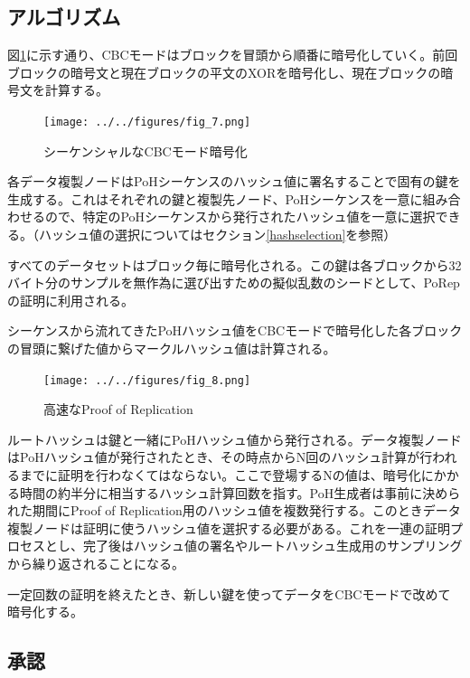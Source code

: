 \documentclass[12pt]{ltjsarticle}
\begin{document}
\subsection{アルゴリズム}
図\ref{fig:encrypt}に示す通り、CBCモードはブロックを冒頭から順番に暗号化していく。前回ブロックの暗号文と現在ブロックの平文のXORを暗号化し、現在ブロックの暗号文を計算する。

\begin{figure}
  \begin{center}
    \centering
    \texttt{[image: ../../figures/fig\_7.png]}
    \caption[図7]{シーケンシャルなCBCモード暗号化\label{fig:encrypt}}
  \end{center}
  \end{figure}

各データ複製ノードはPoHシーケンスのハッシュ値に署名することで固有の鍵を生成する。これはそれぞれの鍵と複製先ノード、PoHシーケンスを一意に組み合わせるので、特定のPoHシーケンスから発行されたハッシュ値を一意に選択できる。（ハッシュ値の選択についてはセクション\ref{hashselection}を参照）

すべてのデータセットはブロック毎に暗号化される。この鍵は各ブロックから32バイト分のサンプルを無作為に選び出すための擬似乱数のシードとして、PoRepの証明に利用される。

シーケンスから流れてきたPoHハッシュ値をCBCモードで暗号化した各ブロックの冒頭に繋げた値からマークルハッシュ値は計算される。

\begin{figure}
  \begin{center}
    \centering
    \texttt{[image: ../../figures/fig\_8.png]}
    \caption[図8]{高速なProof of Replication\label{fig_8}}
  \end{center}
  \end{figure}

ルートハッシュは鍵と一緒にPoHハッシュ値から発行される。データ複製ノードはPoHハッシュ値が発行されたとき、その時点からN回のハッシュ計算が行われるまでに証明を行わなくてはならない。ここで登場するNの値は、暗号化にかかる時間の約半分に相当するハッシュ計算回数を指す。PoH生成者は事前に決められた期間にProof of Replication用のハッシュ値を複数発行する。このときデータ複製ノードは証明に使うハッシュ値を選択する必要がある。これを一連の証明プロセスとし、完了後はハッシュ値の署名やルートハッシュ生成用のサンプリングから繰り返されることになる。

一定回数の証明を終えたとき、新しい鍵を使ってデータをCBCモードで改めて暗号化する。

\subsection{承認}
\end{document}
